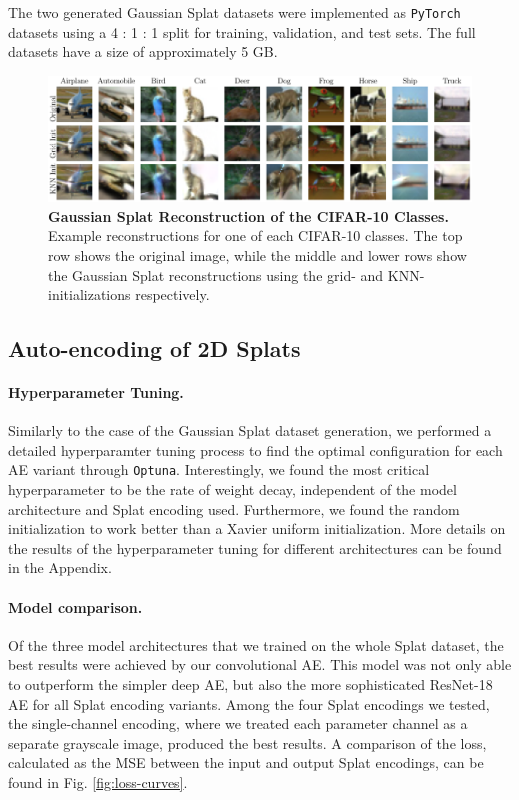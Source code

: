 The two generated Gaussian Splat datasets were implemented as \texttt{PyTorch} datasets using a 4 : 1 : 1 split for training, validation, and test sets. The full datasets have a size of approximately 5 GB.

\begin{figure}
    \centering    \includegraphics[width=1\linewidth]{fig/Splat_reconstruction_comparison.pdf}
    \caption{\textbf{Gaussian Splat Reconstruction of the CIFAR-10 Classes.} Example reconstructions for one of each CIFAR-10 classes. The top row shows the original image, while the middle and lower rows show the Gaussian Splat reconstructions using the grid- and KNN-initializations respectively.}
    \label{fig:Splat-reconstructions}
\end{figure}

\subsection{Auto-encoding of 2D Splats}
\paragraph{Hyperparameter Tuning.} 
Similarly to the case of the Gaussian Splat dataset generation, we performed a detailed hyperparamter tuning process to find the optimal configuration for each AE variant through \texttt{Optuna}. Interestingly, we found the most critical hyperparameter to be the rate of weight decay, independent of the model architecture and Splat encoding used. Furthermore, we found the random initialization to work better than a Xavier uniform initialization. More details on the results of the hyperparameter tuning for different architectures can be found in the Appendix.

\paragraph{Model comparison.} 
Of the three model architectures that we trained on the whole Splat dataset, the best results were achieved by our convolutional AE. This model was not only able to outperform the simpler deep AE, but also the more sophisticated ResNet-18 AE for all Splat encoding variants. Among the four Splat encodings we tested, the single-channel encoding, where we treated each parameter channel as a separate grayscale image, produced the best results. A comparison of the loss, calculated as the MSE between the input and output Splat encodings, can be found in Fig. \ref{fig:loss-curves}.


